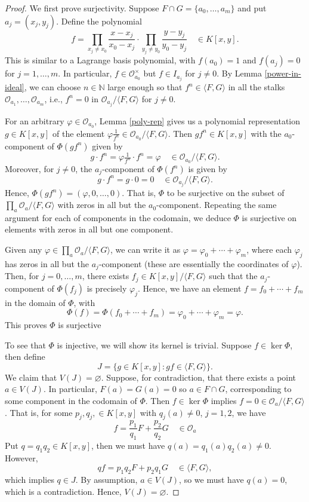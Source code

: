 \documentclass[12pt]{article}
\theoremstyle{definition}
\newcommand{\N}{\mathbb{N}}
\renewcommand{\phi}{\varphi}
\renewcommand{\emptyset}{\varnothing}
\newcommand{\<}{\langle}
\renewcommand{\>}{\rangle}
\renewcommand{\O}{\mathscr{O}}
\begin{document}
\begin{proof}
    We first prove surjectivity. Suppose $F \cap G = \{a_0, \dots, a_m\}$ and put $a_j = (x_j, y_j)$. Define the polynomial
    \[
        f
            = \prod_{x_j \ne x_0} \frac{x - x_j}{x_0 - x_j} \cdot \prod_{y_j \ne y_0} \frac{y - y_j}{y_0 - y_j}
            \quad \in K[x, y].
    \]
    This is similar to a Lagrange basis polynomial, with $f(a_0) = 1$ and $f(a_j) = 0$ for $j = 1, \dots, m$. In particular, $f \in \O_{a_0}^\times$ but $f \in I_{a_j}$ for $j \ne 0$. By Lemma \ref{power-in-ideal}, we can choose $n \in \N$ large enough so that $f^n \in \<F, G\>$ in all the stalks $\O_{a_1}, \dots, \O_{a_m}$, i.e., $f^n = 0$ in $\O_{a_j} / \<F, G\>$ for $j \ne 0$.

    For an arbitrary $\phi \in \O_{a_0}$, Lemma \ref{poly-rep} gives us a polynomial representation $g \in K[x, y]$ of the element $\phi\frac{1}{f^n} \in \O_{a_0} / \<F, G\>$. Then $gf^n \in K[x, y]$ with the $a_0$-component of $\Phi(gf^n)$ given by
    \[
        g \cdot f^n 
            = \phi \tfrac{1}{f^n} \cdot f^n
            = \phi
        \quad \in \O_{a_0} / \<F, G\>.
    \]
    Moreover, for $j \ne 0$, the $a_j$-component of $\Phi(f^n)$ is given by
    \[
        g \cdot f^n = g \cdot 0 = 0
        \quad \in \O_{a_j} / \<F, G\>.
    \]
    Hence, $\Phi(gf^n) = (\phi, 0, \dots, 0)$. That is, $\Phi$ to be surjective on the subset of $\prod_{a} \O_{a} / \<F, G\>$ with zeros in all but the $a_0$-component. Repeating the same argument for each of  components in the codomain, we deduce $\Phi$ is surjective on elements with zeros in all but one component.

    Given any $\phi \in \prod_{a} \O_{a} / \<F, G\>$, we can write it as $\phi = \phi_0 + \cdots + \phi_m$, where each $\phi_j$ has zeros in all but the $a_j$-component (these are essentially the coordinates of $\phi$). Then, for $j = 0, \dots, m$, there exists $f_j \in K[x, y] / \<F, G\>$ such that the $a_j$-component of $\Phi(f_j)$ is precisely $\phi_j$. Hence, we have an element $f = f_0 + \cdots + f_m$ in the domain of $\Phi$, with
    \[
        \Phi(f) = \Phi(f_0 + \cdots + f_m) = \phi_0 + \cdots + \phi_m = \phi.
    \]
    This proves $\Phi$ is surjective

    To see that $\Phi$ is injective, we will show its kernel is trivial. Suppose $f \in \ker\Phi$, then define
    \[
        J = \{g \in K[x, y] : gf \in \<F, G\>\}.
    \]
    We claim that $V(J) = \emptyset$. Suppose, for contradiction, that there exists a point $a \in V(J)$. In particular, $F(a) = G(a) = 0$ so $a \in F \cap G$, corresponding to some component in the codomain of $\Phi$. Then $f \in \ker\Phi$ implies $f = 0 \in \O_{a} / \<F, G\>$. That is, for some $p_j, q_j, \in K[x, y]$ with $q_j(a) \ne 0$, $j = 1, 2$, we have
    \[
        f = \frac{p_1}{q_1}F + \frac{p_2}{q_2}G
        \quad \in \O_a
    \]
    Put $q = q_1q_2 \in K[x, y]$, then we must have $q(a) = q_1(a)q_2(a) \ne 0$. However,
    \[
        qf = p_1q_2 F + p_2q_1 G \quad \in \<F, G\>,
    \]
    which implies $q \in J$. By assumption, $a \in V(J)$, so we must have $q(a) = 0$, which is a contradiction. Hence, $V(J) = \emptyset$.
    

\end{proof}
\end{document}
